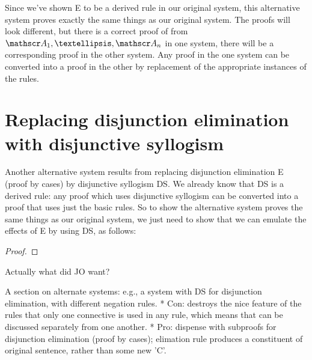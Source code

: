 Since we've shown {\enot\enot}E to be a derived rule in our original system, this alternative system proves exactly the same things as our original system. The proofs will look different, but there is a correct proof of  from $\meta{A}_{1},…,\meta{A}_{n}$ in one system, there will be a corresponding proof in the other system. Any proof in the one system can be converted into a proof in the other by replacement of the appropriate instances of the rules. 


\section{Replacing disjunction elimination with disjunctive syllogism} %
\label{sec:replacing_disjunction_elimination_with_disjunctive_syllogism}

Another alternative system results from replacing disjunction elimination {\eor}E (proof by cases) by disjunctive syllogism DS. We already know that DS is a derived rule: any proof which uses disjunctive syllogism can be converted into a proof that uses just the basic rules. So to show the alternative system proves the same things as our original system, we just need to show that we can emulate the effects of {\eor}E by using DS, as follows: \begin{proof}

\end{proof}


Actually what did JO want?

A section on alternate systems: e.g., a system with DS for disjunction elimination, with different negation rules.
		* Con: destroys the nice feature of the rules that only one connective is used in any rule, which means that can be discussed separately from one another.
		* Pro: dispense with subproofs for disjunction elimination (proof by cases); elimation rule produces a constituent of original sentence, rather than some new 'C'.

